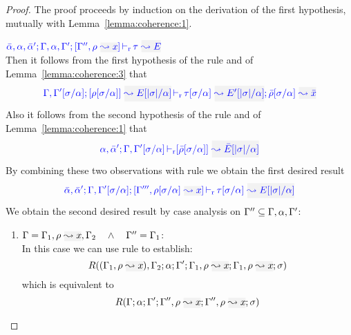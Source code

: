 \begin{proof}
The proof proceeds by induction on the derivation of the first hypothesis, mutually with Lemma~\ref{lemma:coherence:1}.
\begin{description}
\setlength{\itemsep}{1em}
\item[\fbox{\rref{L-RuleMatch}}]\quad$
\dlres{\bar{\alpha},\alpha,\bar{\alpha}'}{\tenv,\alpha,\tenv'}{\tenv'',\ie{\rulet}{x}}{\type}{E}
$ \ \\

  Then it follows from the first hypothesis of the rule and of Lemma~\ref{lemma:coherence:3}
  that
\begin{equation*}
\dmres{\tenv,\tenv'[\suty/\alpha]}{\rulet[\suty/\alpha]}{E[|\suty|/\alpha]}{\type[\suty/\alpha]}{E'[|\suty|/\alpha]}{\ie{\ruleset[\suty/\alpha]}{\bar{x}}}
\end{equation*}
  Also it follows from the second hypothesis of the rule and of Lemma~\ref{lemma:coherence:1}
  that
\begin{equation*}
\drres{{\alpha},\bar{\alpha}'}{\tenv,\tenv'[\suty/\alpha]}{\ruleset[\suty/\alpha]}{\bar{E}[|\suty|/\alpha]}
\end{equation*}
  By combining these two observations with rule  we obtain the first desired result
\begin{equation*}
\dlres{\bar{\alpha},\bar{\alpha}'}{\tenv,\tenv'[\suty/\alpha]}{\tenv''',\ie{\rulet[\suty/\alpha]}{x}}{\type[\suty/\alpha]}{E[|\suty|/\alpha]}
\end{equation*}  
  We obtain the second desired result by case analysis on $\Gamma'' \subseteq \Gamma,\alpha,\Gamma'$:
  \begin{enumerate}
  \item $\tenv = \tenv_1,\ie{\rulet}{x},\tenv_2 \quad\wedge\quad \tenv'' = \tenv_1$: \\
  In this case we can use rule  to establish:
\begin{equation*}
  R((\tenv_1,\ie{\rulet}{x}),\tenv_2;\alpha;\tenv';\tenv_1,\ie{\rulet}{x};\tenv_1,\ie{\rulet}{x};\sigma)
\end{equation*}
  which is equivalent to
\begin{equation*}
  R(\tenv;\alpha;\tenv';\tenv'',\ie{\rulet}{x};\tenv'',\ie{\rulet}{x};\sigma)
\end{equation*}


\end{enumerate}
\end{description}
\end{proof}

